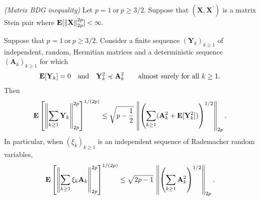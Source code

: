 \begin{theorem}
  \emph{(Matrix BDG inequality)}
  Let
  $
    p = 1
    \ 
    \text{or}\ 
    p \ge 3/2
    .
  $
  Suppose that 
  $
  (
    \mathbf{X}
   , 
   \mathbf{X}^{'}
  )
  $
  is a matrix Stein pair where
  $
   \mathbf{E}
   [ 
    \left\lVert\mathbf{X}\right\rVert
    _{2p}^{2p}
   ]
   <
   \infty
   .
  $
\end{theorem}




\begin{ftheorem}
  \emph{\cite[Corollary~7.3]{Mackey2014}}
  Suppose that
  $
    p = 1
    \ 
    \text{or}\ 
    p \ge 3/2
    .
  $
  Consider a finite sequence
  $
    (\mathbf{Y}_k)_{k\ge 1}
  $
  of independent, random, Hermitian matrices 
  and a deterministic sequence
  $
    (\mathbf{A}_k)_{k\ge 1}
  $
  for which
  \begin{gather}
    \E[\mathbf{Y}_k]
    =
    0
    \quad 
    \text{and}
    \quad
    \mathbf{Y}_k^2
    \preccurlyeq
    \mathbf{A}_k^2
    \qquad
    \text{almost surely for all}\ 
    k \ge 1.
  \end{gather}
  Then
  \begin{gather}
      \mathbf{E}
      \left[
        \left\lVert
          \sum_{k\ge 1}
            \mathbf{Y}_k
        \right\rVert
        _{2p}
        ^{2p}
      \right]
      ^{1/(2p)}
      \le
      \sqrt{
        p - \frac{1}{2}
      }
      \,
      \left\lVert
        \left( 
          \sum_{k\ge 1}
          (
            \mathbf{A}_k^2
            + 
            \mathbf{E}[
              \mathbf{Y}_k^2
            ]
          )
        \right)
        ^{1/2}
        \right\rVert
      _{2p}
      .
  \end{gather}
  In particular, when 
  $
    (\xi_k)_{k\ge 1}
  $
  is an independent sequence of Rademacher random variables,
  \begin{gather}
      \mathbf{E}
      \left[
        \left\lVert
          \sum_{k\ge 1}
            \xi_k
            \mathbf{A}_k
        \right\rVert
        _{2p}
        ^{2p}
      \right]
      ^{1/(2p)}
      \le
      \sqrt{
        2p - 1
        }
      \,
      \left\lVert
        \left( 
          \sum_{k\ge 1}
            \mathbf{A}_k^2
        \right)
        ^{1/2}
        \right\rVert
      _{2p}
      .
  \end{gather}
\end{ftheorem}
